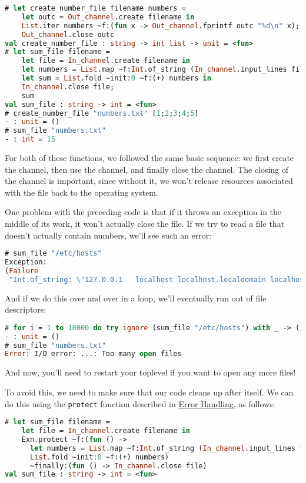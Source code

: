 \begin{lstlisting}[language=Caml]
# let create_number_file filename numbers =
    let outc = Out_channel.create filename in
    List.iter numbers ~f:(fun x -> Out_channel.fprintf outc "%d\n" x);
    Out_channel.close outc
val create_number_file : string -> int list -> unit = <fun>
# let sum_file filename =
    let file = In_channel.create filename in
    let numbers = List.map ~f:Int.of_string (In_channel.input_lines file) in
    let sum = List.fold ~init:0 ~f:(+) numbers in
    In_channel.close file;
    sum
val sum_file : string -> int = <fun>
# create_number_file "numbers.txt" [1;2;3;4;5]
- : unit = ()
# sum_file "numbers.txt"
- : int = 15
\end{lstlisting}

For both of these functions, we followed the same basic sequence: we
first create the channel, then use the channel, and finally close the
channel. The closing of the channel is important, since without it, we
won't release resources associated with the file back to the operating
system.

One problem with the preceding code is that if it throws an exception in
the middle of its work, it won't actually close the file. If we try to
read a file that doesn't actually contain numbers, we'll see such an
error:

\begin{lstlisting}[language=Caml]
# sum_file "/etc/hosts"
Exception:
(Failure
 "Int.of_string: \"127.0.0.1   localhost localhost.localdomain localhost4 localhost4.localdomain4\"").
\end{lstlisting}

And if we do this over and over in a loop, we'll eventually run out of
file descriptors:

\begin{lstlisting}[language=Caml]
# for i = 1 to 10000 do try ignore (sum_file "/etc/hosts") with _ -> () done
- : unit = ()
# sum_file "numbers.txt"
Error: I/O error: ...: Too many open files
\end{lstlisting}

And now, you'll need to restart your toplevel if you want to open any
more files!

To avoid this, we need to make sure that our code cleans up after
itself. We can do this using the \passthrough{\lstinline!protect!}
function described in \href{error-handling.html\#error-handling}{Error
Handling}, as follows:

\begin{lstlisting}[language=Caml]
# let sum_file filename =
    let file = In_channel.create filename in
    Exn.protect ~f:(fun () ->
      let numbers = List.map ~f:Int.of_string (In_channel.input_lines file) in
      List.fold ~init:0 ~f:(+) numbers)
      ~finally:(fun () -> In_channel.close file)
val sum_file : string -> int = <fun>
\end{lstlisting}

